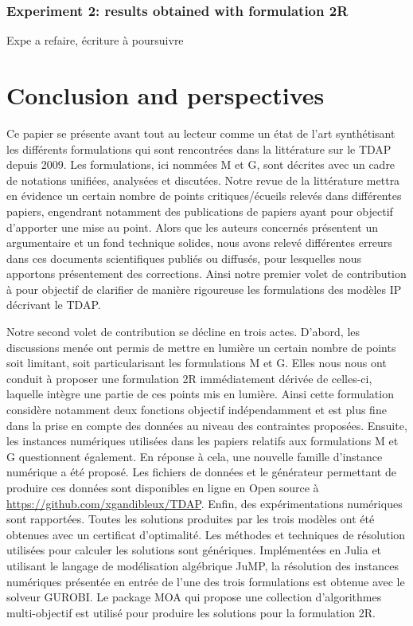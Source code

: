 \documentclass[preprint,12pt,authoryear]{elsarticle}
\begin{document}
%
%
\subsubsection{Experiment 2: results obtained with formulation 2R}\label{sec:res2R}

\color{red}
Expe a refaire, écriture à poursuivre
\color{black}

%
%
\section{Conclusion and perspectives} 
\label{sec:ConclusionPerspectives}

\color{red}
Ce papier se présente avant tout au lecteur comme un état de l’art synthétisant  les différents formulations qui sont rencontrées dans la littérature sur le TDAP depuis 2009. 
Les formulations, ici nommées M et G, sont décrites avec un cadre de notations unifiées, analysées et discutées.
%
Notre revue de la littérature mettra en évidence un certain nombre de points critiques/écueils relevés dans différentes papiers, engendrant notamment des publications de papiers  ayant pour objectif d'apporter une mise au point.
Alors que les auteurs concernés présentent un argumentaire et un fond technique solides, nous avons relevé différentes erreurs dans ces documents scientifiques publiés ou diffusés, pour lesquelles nous apportons présentement des corrections.
Ainsi notre premier volet de contribution à pour objectif de clarifier de manière rigoureuse les formulations des modèles IP décrivant le TDAP.

Notre second volet de contribution se décline en trois actes.
%
D'abord,  les discussions menée ont permis de mettre en lumière un certain nombre de points soit limitant, soit particularisant les formulations M et G.
Elles nous nous ont conduit à proposer une formulation 2R immédiatement dérivée de celles-ci, laquelle intègre une partie de ces points mis en lumière.
Ainsi cette formulation considère notamment deux fonctions objectif indépendamment et est plus fine dans la prise en compte des données au niveau des contraintes proposées.
%
Ensuite, les instances numériques utilisées dans les papiers relatifs aux formulations M et G questionnent également.
En réponse à cela, une nouvelle famille d’instance numérique a été proposé. Les fichiers de données et le générateur permettant de produire ces données sont disponibles en ligne en Open source à \url{https://github.com/xgandibleux/TDAP}.
%
Enfin, des expérimentations numériques sont rapportées.
Toutes les solutions produites par les trois modèles ont été obtenues avec un certificat d’optimalité.
Les méthodes et techniques de résolution utilisées pour calculer les solutions sont génériques. 
Implémentées en Julia et utilisant le langage de modélisation algébrique JuMP, la résolution des instances numériques présentée en entrée de l'une des trois formulations est obtenue avec le solveur GUROBI. Le package MOA qui propose une collection d'algorithmes multi-objectif est utilisé pour produire les solutions pour la formulation 2R. 
\end{document}
